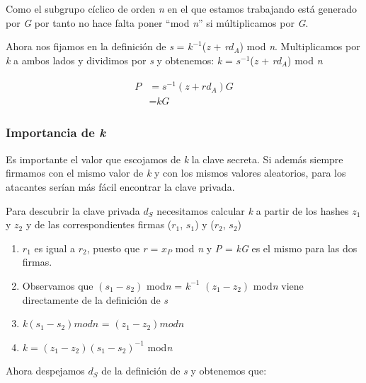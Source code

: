 \documentclass[11pt]{article}
\begin{document}
Como el subgrupo cíclico de orden \textit{n} en el que estamos trabajando está generado por \textit{G} por tanto no hace falta poner ``mod \textit{n}'' si múltiplicamos por \textit{G}.


Ahora nos fijamos en la definición de \textit{s} = \textit{$k^{-1}$}(\textit{z} + \textit{r$d_A$}) mod \textit{n}. Multiplicamos por \textit{k} a ambos lados y dividimos por \textit{s} y obtenemos: \textit{k} = \textit{$s^{-1}$}(\textit{z} + \textit{r$d_A$}) mod \textit{n}

\begin{align}
\begin{split}
P &= \textit{$s^{-1}$}(\textit{z} + \textit{r$d_A$}) \textit{G}\\
&= \textit{kG}
\end{split}
\end{align}


\subsubsection*{Importancia de \textit{k}}

Es importante el valor que escojamos de \textit{k} la clave secreta. Si además siempre firmamos con el mismo valor de \textit{k} y con los mismos valores aleatorios, para los atacantes serían más fácil encontrar la clave privada.

Para descubrir la clave privada \textit{$d_S$} necesitamos calcular \textit{k} a partir de los hashes \textit{$z_1$} y \textit{$z_2$} y de las correspondientes firmas (\textit{$r_1$}, \textit{$s_1$}) y (\textit{$r_2$}, \textit{$s_2$})


\begin{enumerate}
	\item $r_1$ es igual a $r_2$, puesto que \textit{r} = \textit{$x_P$} mod \textit{n} y \textit{P} = \textit{kG} es el mismo para las dos firmas.
	\item Observamos que  $(\textit{$s_1$} - \textit{$s_2$})$ mod\textit{n} = \textit{$k^{-1}$} $(\textit{$z_1$} - \textit{$z_2$})$ mod\textit{n} viene directamente de la definición de \textit{s}
	\item \textit{k}$(\textit{$s_1$} - \textit{$s_2$}) mod\textit{n}$ = $(\textit{$z_1$} - \textit{$z_2$}) mod\textit{n}$
	\item \textit{k}  = $(\textit{$z_1$} - \textit{$z_2$}) (\textit{$s_1$} - \textit{$s_2$})^{-1}$ mod\textit{n}
\end{enumerate}

Ahora despejamos \textit{$d_S$} de la definición de \textit{s} y obtenemos que:
\end{document}
